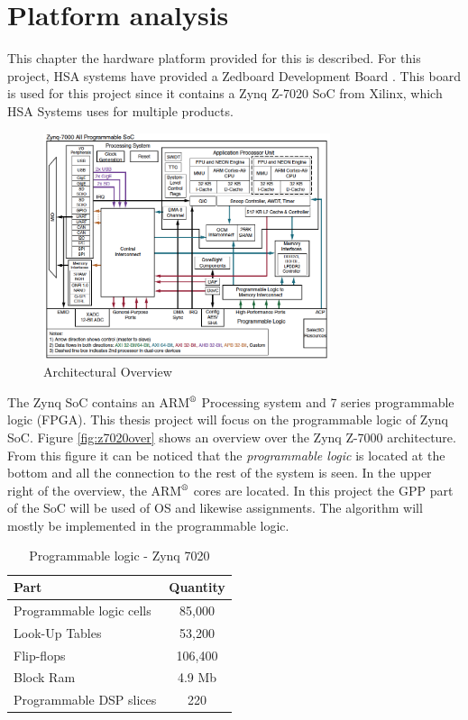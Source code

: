 \chapter{Platform analysis} \label{ch:plaanalysis}
This chapter the hardware platform provided for this is described. For this project, HSA systems have provided a Zedboard Development Board \cite{Zedboard2014}. This board is used for this project since it contains a Zynq Z-7020 SoC from Xilinx, which HSA Systems uses for multiple products. 
\begin{figure}[ht!]
  \centering
  \includegraphics[width=0.75\textwidth]{figures/z7020overview}
  \caption{Architectural Overview \cite{zynq20137000}}
  \label{fig:z7020over}
\end{figure}
The Zynq SoC contains an ARM$^\text{\textregistered}$ Processing system and 7 series programmable logic (FPGA). This thesis project will focus on the programmable logic of Zynq SoC. Figure \vref{fig:z7020over} shows an overview over the Zynq Z-7000 architecture. From this figure it can be noticed that the \textit{programmable logic} is located at the bottom and all the connection to the rest of the system is seen. In the upper right of the overview, the ARM$^\text{\textregistered}$ cores are located. In this project the GPP part of the SoC will be used of OS and likewise assignments. The algorithm will mostly be implemented in the programmable logic.

\begin{table}[ht!]
  \centering
  \begin{tabular}{l c}
  \toprule
  \textbf{Part} & \textbf{Quantity} \\
  \toprule
  Programmable logic cells &  85,000\\
  \midrule
  Look-Up Tables & 53,200\\
  \midrule
  Flip-flops & 106,400\\
  \midrule
  Block Ram  & 4.9 Mb\\
  \midrule
  Programmable DSP slices & 220 \\
  \bottomrule
  \end{tabular}
  \caption{Programmable logic - Zynq 7020 \cite{zynq20137000}}
  \label{tb:z7020-parts}
\end{table}

